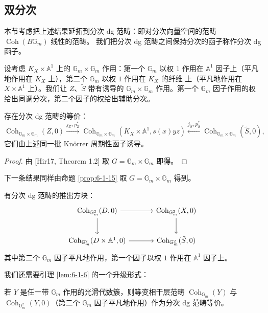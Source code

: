 \subsection{双分次}

本节考虑把上述结果延拓到分次 dg 范畴：即对分次向量空间的范畴 $\operatorname{Coh}(B\mathbb G_m)$ 线性的范畴。
我们把分次 dg 范畴之间保持分次的函子称作分次 dg 函子。

设考虑 $K_X\times\mathbb A^1$ 上的 $\mathbb G_m\times\mathbb G_m$ 作用：第一个 $\mathbb G_m$ 以权 $1$ 作用在
$\mathbb A^1$ 因子上（平凡地作用在 $K_X$ 上），第二个 $\mathbb G_m$ 以权 $1$ 作用在 $K_X$ 的纤维
上（平凡地作用在 $X\times\mathbb A^1$ 上）。我们让 $Z$、$\tilde S$ 带有诱导的
$\mathbb G_m\times\mathbb G_m$ 作用。第一个 $\mathbb G_m$ 因子作用的权给出同调分次，第二个因子的权给出辅助分次。


\begin{theorem}\label{thm:6-2-1}
存在分次 dg 范畴的等价：
\[
\operatorname{Coh}_{\mathbb G_m\times\mathbb G_m}(Z,0)\xrightarrow{j_{Z*}p_Z^*}
\operatorname{Coh}_{\mathbb G_m\times\mathbb G_m}(K_X\times\mathbb A^1,s(x)yz)
\xleftarrow{j_{\tilde S*}p_{\tilde S}^*}\operatorname{Coh}_{\mathbb G_m\times\mathbb G_m}(\tilde S,0),
\]
它们由上述同一批 Knörrer 周期性函子诱导。
\end{theorem}

\begin{proof}
由 [Hir17, Theorem 1.2] 取 $G=\mathbb G_m\times\mathbb G_m$ 即得。
\end{proof}

下一条结果同样由命题 \ref{prop:6-1-15} 取 $G=\mathbb G_m\times\mathbb G_m$ 得到。

\begin{proposition}\label{prop:6-2-2}
有分次 dg 范畴的推出方块：
\[
\begin{tikzcd}[column sep=3.4em, row sep=2.2em]
\operatorname{Coh}_{\mathbb G_m^2}(D,0) \arrow[r] \arrow[d] & \operatorname{Coh}_{\mathbb G_m^2}(X,0) \arrow[d] \\
\operatorname{Coh}_{\mathbb G_m^2}(D\times\mathbb A^1,0) \arrow[r] & \operatorname{Coh}_{\mathbb G_m^2}(\tilde S,0)
\end{tikzcd}
\]
其中第二个 $\mathbb G_m$ 因子平凡地作用，第一个因子以权 $1$ 作用在 $\mathbb A^1$ 因子上。
\end{proposition}

我们还需要引理 \ref{lem:6-1-6} 的一个升级形式：

\begin{lemma}\label{lem:6-2-3}
若 $Y$ 是任一带 $\mathbb G_m$ 作用的光滑代数簇，则等变相干层范畴 $\operatorname{Coh}_{\mathbb G_m}(Y)$ 与
$\operatorname{Coh}_{\mathbb G_m^2}(Y,0)$（第二个 $\mathbb G_m$ 因子平凡地作用）作为分次 dg 范畴等价。
\end{lemma}
